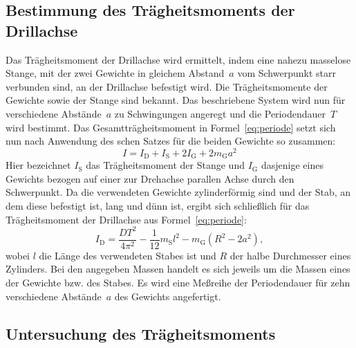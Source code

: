 \subsection{Bestimmung des Trägheitsmoments der Drillachse}

Das Trägheitsmoment der Drillachse wird ermittelt, indem eine nahezu
masselose Stange, mit der zwei Gewichte in gleichem Abstand~$a$ vom
Schwerpunkt starr verbunden sind, an der Drillachse befestigt wird.  Die
Trägheitsmomente der Gewichte sowie der Stange sind bekannt.  Das
beschriebene System wird nun für verschiedene Abstände~$a$ zu
Schwingungen angeregt und die Periodendauer~$T$ wird bestimmt.  Das
Gesamtträgheitsmoment in Formel~\eqref{eq:periode} setzt sich nun nach
Anwendung des schen Satzes für die beiden Gewichte so
zusammen:
\begin{equation}
  I = I_\text{D} + I_\text{S} + 2I_\text{G} + 2m_\text{G} a^2
\end{equation}
Hier bezeichnet $I_\text{S}$ das Trägheitsmoment der Stange und
$I_\text{G}$ dasjenige eines Gewichts bezogen auf einer zur Drehachse
parallen Achse durch den Schwerpunkt.  Da die verwendeten Gewichte
zylinderförmig sind und der Stab, an dem diese befestigt ist, lang und
dünn ist, ergibt sich schließlich für das Trägheitsmoment der Drillachse
aus Formel~\eqref{eq:periode}:
\begin{equation}
  \label{eq:traegheit-drillachse}
  I_\text{D} = \frac{D T^2}{4 \pi^2} - \frac{1}{12} m_\text{S} l^2 -
  m_\text{G} (R^2 - 2 a^2),
\end{equation}
wobei $l$ die Länge des verwendeten Stabes ist und $R$ der halbe
Durchmesser eines Zylinders.  Bei den angegeben Massen handelt es sich
jeweils um die Massen eines der Gewichte bzw. des Stabes.  Es wird eine
Meßreihe der Periodendauer für zehn verschiedene Abstände~$a$ des
Gewichts angefertigt.

\subsection{Untersuchung des Trägheitsmoments}

